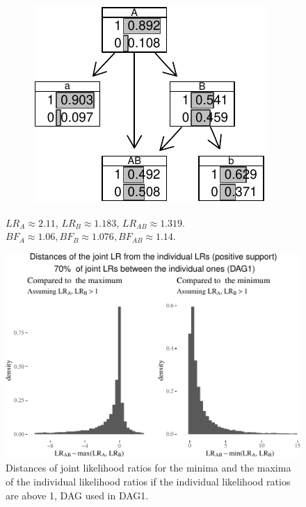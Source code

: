 \documentclass[
  10pt,
  dvipsnames,enabledeprecatedfontcommands]{scrartcl}
\begin{document}
\begin{figure}
\begin{subfigure}[!ht]{0.45\textwidth}
\begin{center}\includegraphics[width=0.7\linewidth]{conjunction-appendix14_files/figure-latex/unnamed-chunk-21-1} \end{center}
\end{subfigure}
\caption{$LR_A  \approx 2.11$, $LR_B \approx 1.183$,  $LR_{AB} \approx 1.319$. \newline  $BF_A \approx  1.06, BF_B \approx  1.076, BF_{AB}\approx   1.14$.}
\label{tab:CPTconjunctionBNL}
\end{figure}

\begin{figure}


\begin{center}\includegraphics[width=0.7\linewidth]{conjunction-appendix14_files/figure-latex/unnamed-chunk-22-1} \end{center}

\caption{Distances of joint likelihood ratios for the minima and the maxima of the individual likelihood ratios if the individual likelihood ratios are above 1, DAG used in \textsf{DAG1}.}
\label{fig:LRabovePlot}
\end{figure}
\end{document}
